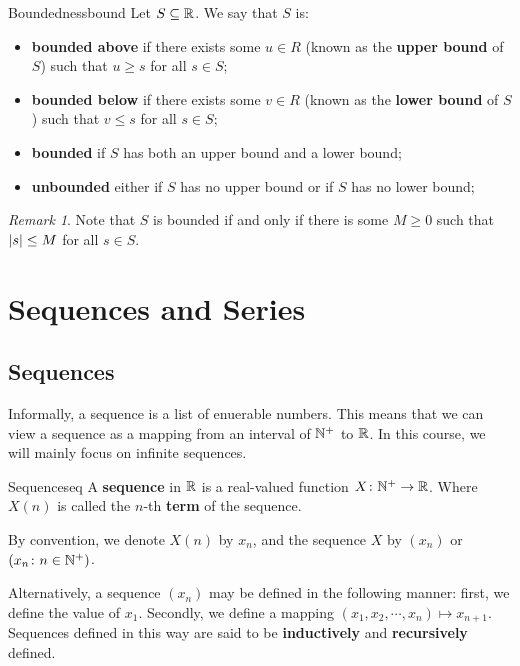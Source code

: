 \documentclass[math]{amznotes}
\theoremstyle{remark}
\newtheorem*{remark}{Remark}
\begin{document}
\begin{dfnbox}{Boundedness}{bound}
    Let $S \subseteq \mathbb{R}$. We say that $S$ is:
    \begin{itemize}
        \item {\color{red} \textbf{bounded above}} if there exists some $u \in R$ (known as the {\color{red} \textbf{upper bound}} of $S$) such that $u \geq s$ for all $s \in S$; 
        \item {\color{red} \textbf{bounded below}} if there exists some $v \in R$ (known as the {\color{red} \textbf{lower bound}} of $S$) such that $v \leq s$ for all $s \in S$; 
        \item {\color{red} \textbf{bounded}} if $S$ has both an upper bound and a lower bound;
        \item {\color{red} \textbf{unbounded}} either if $S$ has no upper bound or if $S$ has no lower bound;     
    \end{itemize}
\end{dfnbox}
\begin{notebox}
    \begin{remark}
        Note that $S$ is bounded if and only if there is some $M \geq 0$ such that ${\left\lvert {s} \right\rvert} \leq M$ for all $s \in S$.
    \end{remark}
\end{notebox}

\chapter{Sequences and Series}
\section{Sequences}
Informally, a sequence is a list of enuerable numbers. This means that we can view a sequence as a mapping from an interval of $\mathbb{N}^+$ to $\mathbb{R}$. In this course, we will mainly focus on infinite sequences.
\begin{dfnbox}{Sequence}{seq}
    A {\color{red} \textbf{sequence}} in $\mathbb{R}$ is a real-valued function $X \colon \mathbb{N}^+ \to \mathbb{R}$. Where $X(n)$ is called the $n$-th {\color{red} \textbf{term}} of the sequence.
\end{dfnbox}
By convention, we denote $X(n)$ by $x_n$, and the sequence $X$ by $(x_n)$ or $(x_n \colon n \in \mathbb{N}^+)$.

Alternatively, a sequence $(x_n)$ may be defined in the following manner: first, we define the value of $x_1$. Secondly, we define a mapping $(x_1, x_2, \cdots, x_n) \mapsto x_{n + 1}$. Sequences defined in this way are said to be \textbf{inductively} and \textbf{recursively} defined.
\end{document}
